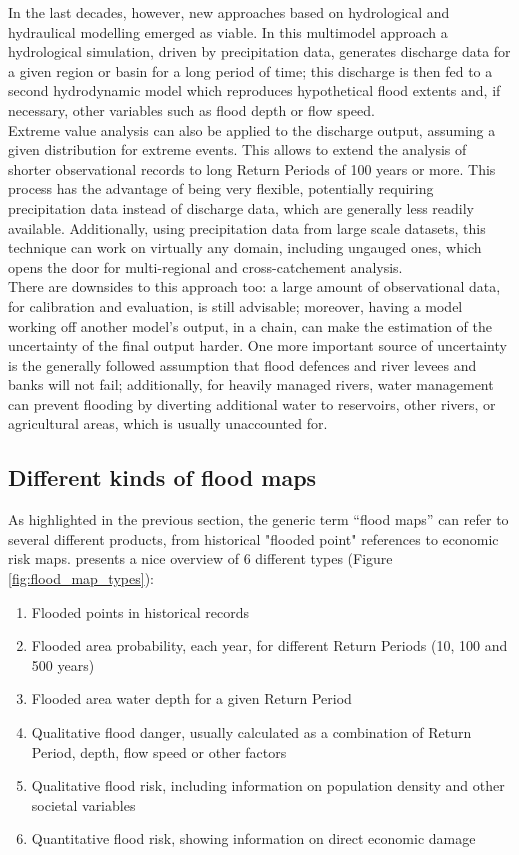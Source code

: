 In the last decades, however, new approaches based on hydrological and hydraulical modelling emerged as viable. In this multimodel approach a hydrological simulation, driven by precipitation data, generates discharge data for a given region or basin for a long period of time; this discharge  is then fed to a second hydrodynamic model which reproduces hypothetical flood extents and, if necessary, other variables such as flood depth or flow speed.\\
Extreme value analysis can also be applied to the discharge output, assuming a given distribution for extreme events. This allows to extend the analysis of shorter observational records to long Return Periods of 100 years or more. This process has the advantage of being very flexible, potentially requiring precipitation data instead of discharge data, which are generally less readily available. Additionally, using precipitation data from large scale datasets, this technique can work on virtually any domain, including ungauged ones, which opens the door for multi-regional and cross-catchement analysis.\\

There are downsides to this approach too: a large amount of observational data, for calibration and evaluation, is still advisable; moreover, having a model working off another model's output, in a chain, can make the estimation of the uncertainty of the final output harder. One more important source of uncertainty is the generally followed assumption that flood defences and river levees and banks will not fail; additionally, for heavily managed rivers, water management can prevent flooding by diverting additional water to reservoirs, other rivers, or agricultural areas, which is usually unaccounted for.

\subsection{Different kinds of flood maps} \label{sec:flood_map_types}
As highlighted in the previous section, the generic term \enquote{flood maps} can refer to several different products, from historical "flooded point" references to economic risk maps. \cite{DeMoel2009} presents a nice overview of 6 different types (Figure \ref{fig:flood_map_types}):

\begin{enumerate}[label=\Alph*] %
\item Flooded points in historical records
\item Flooded area probability, each year, for different Return Periods (10, 100 and 500 years)\label{enum:RP_map}
\item Flooded area water depth for a given Return Period
\item Qualitative flood danger, usually calculated as a combination of Return Period, depth, flow speed or other factors
\item Qualitative flood risk, including information on population density and other societal variables
\item Quantitative flood risk, showing information on direct economic damage
\end{enumerate}

